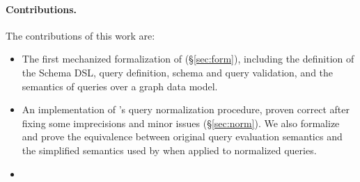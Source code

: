 





\paragraph{Contributions.}
The contributions of this work are:
\begin{itemize}
    \item The first mechanized formalization of \gql (\S\ref{sec:form}), including the definition of the Schema DSL, query definition, schema and query validation, and the semantics of queries over a graph data model.
    \item An implementation of \HP's query normalization procedure, proven correct after fixing some imprecisions and minor issues (\S\ref{sec:norm}). We also formalize and prove the equivalence between original query evaluation semantics and the simplified semantics used by \HP when applied to normalized queries.
    \item {}
\end{itemize}

